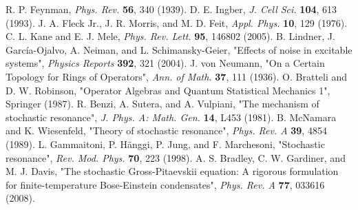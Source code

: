 \documentclass[a4paper,11pt,ja=standard,lualatex]{bxjsarticle}
\begin{document}
\FloatBarrier
\begin{thebibliography}{99}
 R. P. Feynman, \textit{Phys. Rev.} \textbf{56}, 340 (1939).
 D. E. Ingber, \textit{J. Cell Sci.} \textbf{104}, 613 (1993).
 J. A. Fleck Jr., J. R. Morris, and M. D. Feit, \textit{Appl. Phys.} \textbf{10}, 129 (1976).
 C. L. Kane and E. J. Mele, \textit{Phys. Rev. Lett.} \textbf{95}, 146802 (2005).
 B. Lindner, J. García-Ojalvo, A. Neiman, and L. Schimansky-Geier, "Effects of noise in excitable systems", \textit{Physics Reports} \textbf{392}, 321 (2004).
 J. von Neumann, "On a Certain Topology for Rings of Operators", \textit{Ann. of Math.} \textbf{37}, 111 (1936).
 O. Bratteli and D. W. Robinson, "Operator Algebras and Quantum Statistical Mechanics 1", Springer (1987).
 R. Benzi, A. Sutera, and A. Vulpiani, "The mechanism of stochastic resonance", \textit{J. Phys. A: Math. Gen.} \textbf{14}, L453 (1981).
 B. McNamara and K. Wiesenfeld, "Theory of stochastic resonance", \textit{Phys. Rev. A} \textbf{39}, 4854 (1989).
 L. Gammaitoni, P. Hänggi, P. Jung, and F. Marchesoni, "Stochastic resonance", \textit{Rev. Mod. Phys.} \textbf{70}, 223 (1998).
 A. S. Bradley, C. W. Gardiner, and M. J. Davis, "The stochastic Gross-Pitaevskii equation: A rigorous formulation for finite-temperature Bose-Einstein condensates", \textit{Phys. Rev. A} \textbf{77}, 033616 (2008).
\end{thebibliography}
\end{document}
